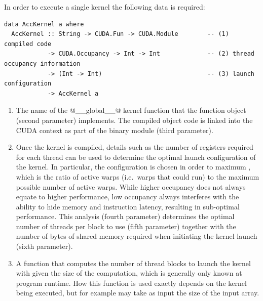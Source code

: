 In order to execute a single kernel the following data is required:
%
\begin{lstlisting}[style=haskell]
data AccKernel a where
  AccKernel :: String -> CUDA.Fun -> CUDA.Module        -- (1) compiled code
            -> CUDA.Occupancy -> Int -> Int             -- (2) thread occupancy information
            -> (Int -> Int)                             -- (3) launch configuration
            -> AccKernel a
\end{lstlisting}
%
\begin{enumerate}
\item The name of the @__global__@ kernel function that the function
    object (second parameter) implements. The compiled object code is linked
    into the CUDA context as part of the binary module (third parameter).

\item Once the kernel is compiled, details such as the number of registers
    required for each thread can be used to determine the optimal launch
    configuration of the kernel. In particular, the configuration is chosen in
    order to maximum , which is the ratio of active
    warps (i.e.\ warps that could run) to the maximum possible number of active
    warps. While higher occupancy does not always equate to higher performance,
    low occupancy always interferes with the ability to hide memory and
    instruction latency, resulting in sub-optimal performance. This analysis
    (fourth parameter) determines the optimal number of threads per block to use
    (fifth parameter) together with the number of bytes of shared memory
    required when initiating the kernel launch (sixth parameter).

\item A function that computes the number of thread blocks to launch the kernel
    with given the size of the computation, which is generally only known at
    program runtime. How this function is used exactly depends on the kernel
    being executed, but for example may take as input the size of the input
    array.
\end{enumerate}

